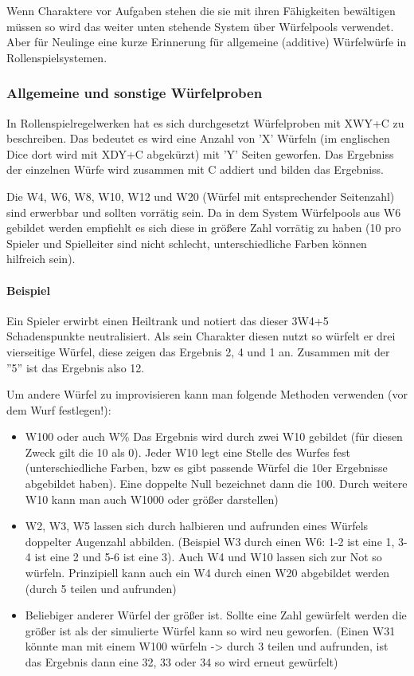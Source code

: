 \documentclass{article}
\begin{document}
Wenn Charaktere vor Aufgaben stehen die sie mit ihren Fähigkeiten bewältigen müssen so wird das weiter unten stehende
System über Würfelpools verwendet. Aber für Neulinge eine kurze Erinnerung für allgemeine (additive) Würfelwürfe in
Rollenspielsystemen.

\subsubsection{Allgemeine und sonstige Würfelproben}

In Rollenspielregelwerken hat es sich durchgesetzt Würfelproben mit XWY+C zu beschreiben. Das bedeutet es wird eine
Anzahl von 'X' Würfeln (im englischen Dice dort wird mit XDY+C abgekürzt) mit 'Y' Seiten geworfen. Das Ergebniss der
einzelnen Würfe wird zusammen mit C addiert und bilden das Ergebniss.

Die W4, W6, W8, W10, W12 und W20 (Würfel mit entsprechender Seitenzahl) sind erwerbbar und sollten vorrätig sein.
Da in dem System Würfelpools aus W6 gebildet werden empfiehlt es sich diese in größere Zahl vorrätig zu haben
(10 pro Spieler und Spielleiter sind nicht schlecht, unterschiedliche Farben können hilfreich sein).

\paragraph{Beispiel}

Ein Spieler erwirbt einen Heiltrank und notiert das dieser 3W4+5 Schadenspunkte neutralisiert. Als sein Charakter
diesen nutzt so würfelt er drei vierseitige Würfel, diese zeigen das Ergebnis 2, 4 und 1 an. Zusammen mit der ''5''
ist das Ergebnis also 12.

Um andere Würfel zu improvisieren kann man folgende Methoden verwenden (vor dem Wurf festlegen!):

\begin{itemize}
\item W100 oder auch W\% Das Ergebnis wird durch zwei W10 gebildet (für diesen Zweck gilt die 10 als 0). Jeder W10 legt eine Stelle des Wurfes fest (unterschiedliche Farben, bzw es gibt passende Würfel die 10er Ergebnisse abgebildet haben). Eine doppelte Null bezeichnet dann die 100. Durch weitere W10 kann man auch W1000 oder größer darstellen)
\item W2, W3, W5 lassen sich durch halbieren und aufrunden eines Würfels doppelter Augenzahl abbilden. (Beispiel W3 durch einen W6: 1-2 ist eine 1, 3-4 ist eine 2 und 5-6 ist eine 3). Auch W4 und W10 lassen sich zur Not so würfeln. Prinzipiell kann auch ein W4 durch einen W20 abgebildet werden (durch 5 teilen und aufrunden)
\item Beliebiger anderer Würfel der größer ist. Sollte eine Zahl gewürfelt werden die größer ist als der simulierte Würfel kann so wird neu geworfen. (Einen W31 könnte man mit einem W100 würfeln -> durch 3 teilen und aufrunden, ist das Ergebnis dann eine 32, 33 oder 34 so wird erneut gewürfelt)
\end{itemize}
\end{document}
